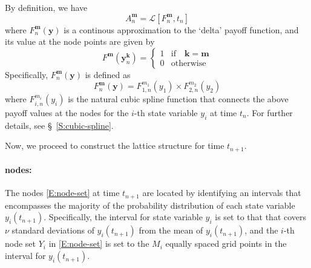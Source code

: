 \documentclass{texyise}
\newcommand{\valuebackwardnodisc}{\mathcal{L}}
\begin{document}
By definition, we have
\begin{equation}
    A_{n}^{\bm{m}} = \valuebackwardnodisc[F_n^{\bm{m}}, t_n] \label{E:arrow-debreu-def}
\end{equation}
where $F_n^{\bm{m}}(\bm{y})$ is a continous approximation to the `delta' payoff function, and its value at the node points are given by
\begin{equation}
    F^{\bm{m}}(\bm{y}_{n}^{\bm{k}}) = 
    \left\{
    \begin{array}{cl}
        1 & \text{if}\quad \bm{k} = \bm{m} \\
        0 & \text{otherwise}
    \end{array}
    \right.
    \label{E:delta-payoff}
\end{equation}
Specifically, $F_n^{\bm{m}}(\bm{y})$ is defined as
\begin{equation}
    F_n^{\bm{m}}(\bm{y}) = F_{1,n}^{m_1}(y_1) \times F_{2,n}^{m_2}(y_2)
\end{equation}
where $F_{i,n}^{m_i}(y_i)$ is the natural cubic spline function that connects the above payoff values at the nodes for the $i$-th state variable $y_i$ at time $t_n$. For further details, see \S~\ref{S:cubic-spline}.

Now, we proceed to construct the lattice structure for time $t_{n+1}$. 

\paragraph*{nodes:}

The nodes \eqref{E:node-set} at time $t_{n+1}$ are located by identifying an intervals that encompasses the majority of the probability distribution of each state variable $y_i(t_{n+1})$. Specifically, the interval for state variable $y_i$ is set to that that covers $\nu$ standard deviations of $y_i(t_{n+1})$ from the mean of $y_i(t_{n+1})$, and the $i$-th node set $Y_i$ in \eqref{E:node-set} is set to the $M_i$ equally spaced grid points in the interval for $y_i(t_{n+1})$.
\end{document}
